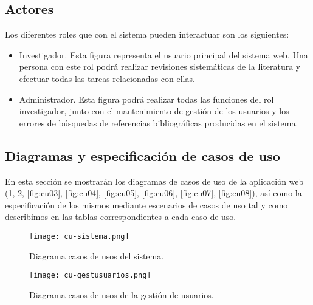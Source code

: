 \subsection{Actores} 
Los diferentes roles que con el sistema pueden interactuar son los siguientes:

\begin{itemize}
	\item Investigador. Esta figura representa el usuario principal del sistema web. Una persona con este rol podrá realizar revisiones sistemáticas de la literatura y efectuar todas las tareas relacionadas con ellas.
	\item Administrador. Esta figura podrá realizar todas las funciones del rol investigador, junto con el mantenimiento de gestión de los usuarios y los errores de búsquedas de referencias bibliográficas producidas en el sistema.
\end{itemize}


\subsection{Diagramas y especificación de casos de uso}
En esta sección se mostrarán los diagramas de casos de uso de la aplicación web (\ref{fig:cu01}, \ref{fig:cu02}, \ref{fig:cu03}, \ref{fig:cu04}, \ref{fig:cu05}, \ref{fig:cu06}, \ref{fig:cu07}, \ref{fig:cu08}), así como la especificación de los mismos mediante escenarios de casos de uso tal y como describimos en las tablas correspondientes a cada caso de uso.

\begin{figure}[hp!]
	\begin{center} 
		\texttt{[image: cu-sistema.png]}
		\caption{Diagrama casos de usos del sistema.}
		\label{fig:cu01}
	\end{center}
\end{figure}

\begin{figure}[hp!]
	\begin{center} 
		\texttt{[image: cu-gestusuarios.png]}
		\caption{Diagrama casos de usos de la gestión de usuarios.}
		\label{fig:cu02}
	\end{center}
\end{figure}

